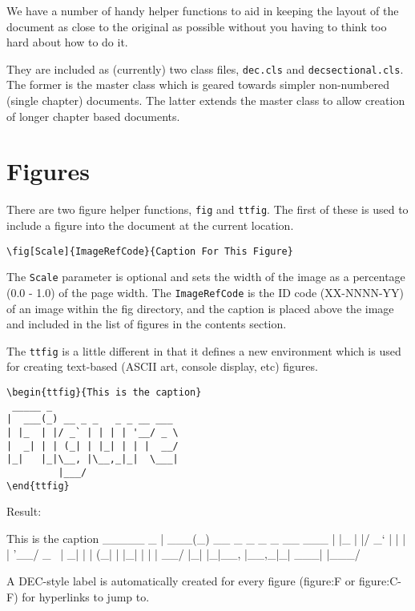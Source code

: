 \documentclass{decsectional}
\begin{document}
We have a number of handy helper functions to aid in keeping the layout of the document as close to the original
as possible without you having to think too hard about how to do it.

They are included as (currently) two class files, \texttt{dec.cls} and \texttt{decsectional.cls}. The former is the master class
which is geared towards simpler non-numbered (single chapter) documents. The latter extends the master class to allow
creation of longer chapter based documents.

\section{Figures}

There are two figure helper functions, \texttt{fig} and \texttt{ttfig}.  The first of these is used to include a figure
into the document at the current location.

\begin{verbatim}
\fig[Scale]{ImageRefCode}{Caption For This Figure}
\end{verbatim}

The \texttt{Scale} parameter is optional and sets the width of the image as a percentage (0.0 - 1.0) of the page width.
The \texttt{ImageRefCode} is the ID code (XX-NNNN-YY) of an image within the fig directory, and the caption is placed
above the image and included in the list of figures in the contents section.

The \texttt{ttfig} is a little different in that it defines a new environment which is used for creating
text-based (ASCII art, console display, etc) figures.


\begin{verbatim}
\begin{ttfig}{This is the caption}
 _____ _                      
|  ___(_) __ _ _   _ _ __ ___ 
| |_  | |/ _` | | | | '__/ _ \
|  _| | | (_| | |_| | | |  __/
|_|   |_|\__, |\__,_|_|  \___|
         |___/ 
\end{ttfig}
\end{verbatim}

Result:

\begin{ttfig}{This is the caption}
 _____ _
|  ___(_) __ _ _   _ _ __ ___
| |_  | |/ _` | | | | '__/ _ \
|  _| | | (_| | |_| | | |  __/
|_|   |_|\__, |\__,_|_|  \___|
         |___/
\end{ttfig}

A DEC-style label is automatically created for every figure (figure:F or figure:C-F) for hyperlinks to jump to.
\end{document}
